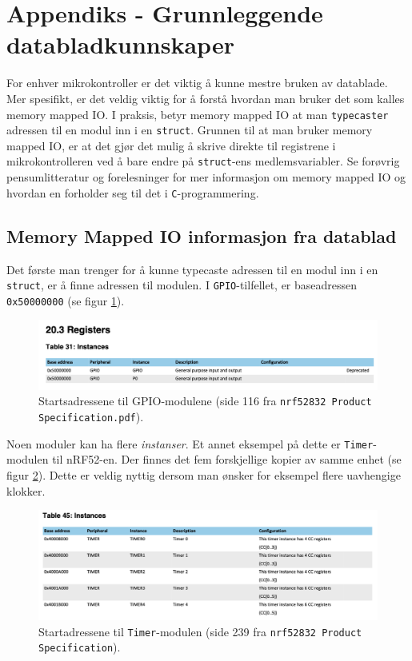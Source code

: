 \appendix


\section{Appendiks - Grunnleggende databladkunnskaper}\label{app:datablad}

For enhver mikrokontroller er det viktig å kunne mestre bruken av datablade. Mer spesifikt, er det veldig viktig for å forstå hvordan man bruker det som kalles memory mapped IO. I praksis, betyr memory mapped IO at man \verb|typecaster| adressen til en modul inn i en \verb|struct|. Grunnen til at man bruker memory mapped IO, er at det gjør det mulig å skrive direkte til registrene i mikrokontrolleren ved å bare endre på \verb|struct|-ens medlemsvariabler. Se forøvrig pensumlitteratur og forelesninger for mer informasjon om memory mapped IO og hvordan en forholder seg til det i \verb|C|-programmering.

\subsection{Memory Mapped IO informasjon fra datablad}
Det første man trenger for å kunne typecaste adressen til en modul inn i en \verb|struct|, er å finne adressen til modulen. I \verb|GPIO|-tilfellet, er baseadressen \verb|0x50000000| (se figur \ref{fig:app-gpio-modul}).


\begin{figure}[ht]
    \centering
    \includegraphics[scale=0.5]{figures/gpio_addresse.png}
    \caption{Startsadressene til GPIO-modulene (side 116 fra \texttt{nrf52832 Product Specification.pdf}).}
    \label{fig:app-gpio-modul}
\end{figure}

Noen moduler kan ha flere \textit{instanser}. Et annet eksempel på dette er \verb|Timer|-modulen til nRF52-en. Der finnes det fem forskjellige kopier av samme enhet (se figur \ref{fig:app-timerl}). Dette er veldig nyttig dersom man ønsker for eksempel flere uavhengige klokker.

\begin{figure}[ht]
    \centering
    \includegraphics[scale=0.5]{figures/timer_memory.png}
    \caption{Startadressene til \texttt{Timer}-modulen (side 239 fra \texttt{nrf52832 Product Specification}).}
    \label{fig:app-timerl}
\end{figure}


